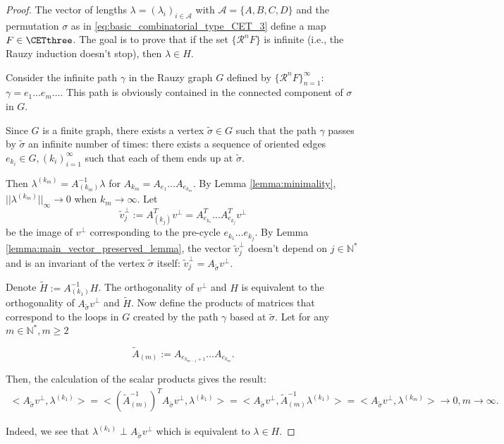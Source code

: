 \documentclass[12pt]{article}
\theoremstyle{definition}
\begin{document}
\smallskip




\begin{proof}
The vector of lengths $\lambda=(\lambda_i)_{i \in \mathcal{A}}$ with $\mathcal{A}=\{A,B,C,D\}$  and the permutation $\sigma$ as in \ref{eq:basic_combinatorial_type_CET_3} define a map $F \in \CETthree$. The goal is to prove that if the set $\{\mathcal{R}^n F\}$ is infinite (i.e., the Rauzy induction doesn't stop), then $\lambda \in H$.

Consider the infinite path $\gamma$ in the Rauzy graph $G$ defined by $\{\mathcal{R}^n F\}_{n=1}^{\infty}$: $\gamma=e_1 \ldots e_m \ldots $. This path is obviously contained in the connected component of $\sigma$ in $G$. 

Since $G$ is a finite graph, there exists a vertex $\tilde{\sigma} \in G$ such that the path $\gamma$ passes by $\tilde{\sigma}$ an infinite number of times: there exists a sequence of oriented edges $e_{k_i} \in G,  (k_i)_{i=1}^{\infty}$ such that each of them ends up at $\tilde{\sigma}$. 

Then $\lambda^{(k_m)}=A_{(k_m)}^{-1} \lambda$ for $A_{k_m}=A_{e_1} \ldots A_{e_{k_m}}$. By Lemma \ref{lemma:minimality}, $||\lambda^{(k_m)}||_{\infty} \rightarrow 0$ when $k_m \rightarrow \infty$. Let 
\begin{equation*}
\tilde{v}^{\perp}_j:=A_{(k_j)}^T v^{\perp}=A_{e_{k_1}}^T \ldots A_{e_{k_j}}^Tv^{\perp}
\end{equation*}
be the image of $v^{\perp}$ corresponding to the pre-cycle $e_{k_1} \ldots e_{k_j}$. By Lemma \ref{lemma:main_vector_preserved_lemma}, the vector $\tilde{v}^{\perp}_j$ doesn't depend on $j \in \mathbb{N}^*$ and is an invariant of the vertex $\tilde{\sigma}$ itself: $\tilde{v}^{\perp}_j=A_{\tilde{\sigma}} {v}^{\perp}$.

Denote $\tilde{H}:=A^{-1}_{(k_1)} H$. The orthogonality of $v^{\perp}$ and $H$ is equivalent to the orthogonality of $A_{\tilde{\sigma}} {v}^{\perp}$ and $\tilde{H}$. Now define the products of matrices that correspond to the loops in $G$ created by the path $\gamma$ based at $\tilde{\sigma}$. Let for any $m \in \mathbb{N}^*, m \geq 2$

\begin{equation}\label{eq:cycle_matrix_A}
\tilde{A}_{(m)}:=A_{e_{k_{m-1}+1}} \ldots A_{e_{k_m}}.
\end{equation}

Then, the calculation of the scalar products gives the result:
\begin{align*}
<A_{\tilde{\sigma}} {v}^{\perp}, \lambda^{(k_1)}> = <(\tilde{A}_{(m)}^{-1})^TA_{\tilde{\sigma}} {v}^{\perp}, \lambda^{(k_1)}> = <A_{\tilde{\sigma}} {v}^{\perp}, \tilde{A}_{(m)}^{-1} \lambda^{(k_1)}>= <A_{\tilde{\sigma}} {v}^{\perp},\lambda^{(k_m)} > \rightarrow 0, m \rightarrow \infty.
\end{align*}

Indeed, we see that $\lambda^{(k_1)} \perp A_{\tilde{\sigma}} {v}^{\perp}$ which is equivalent to $\lambda \in H$.

\end{proof}
\end{document}
